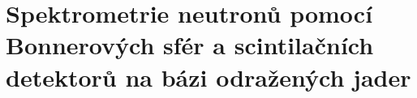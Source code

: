 \section[Spektrometrie neutronů]{Spektrometrie neutronů pomocí Bonnerových sfér a scintilačních detektorů na bázi odražených jader}

